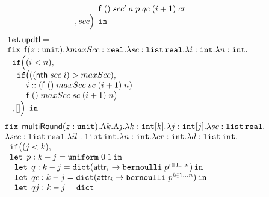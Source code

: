 \begin{figure}
\[\begin{array}{l}
 \hspace{1.2cm} \mathsf{f}  \; () \; scc' \; a \; p \; qc
                \; (i+1) \;  cr  \\ 
 \hspace{0.2cm} , scc  \Big ) \; \mathop{ \mathtt{in}}
\end{array}
\]
%
%
\[
\begin{array}{l}
\mathop{\mathtt{let}} \mathsf{updtI} = \\
                 \mathop{\mathtt{fix}} \;  \mathsf{f}(z : \mathtt{unit}). \lambda maxScc: \mathtt{real}. 
                 \lambda sc: \mathtt{list} \, \mathtt{real}. \lambda i: \mathtt{int}. \lambda n: \mathtt{int}. \\
 \hspace{.2cm}   \mathtt{if} \Big (   (i < n)  ,  \\
 \hspace{0.4cm}  \mathtt{if} \big( ( ( \mathsf{nth} \; scc \; i)  >  maxScc  ) ,       \\
 \hspace{0.8cm}  i :: ( \mathsf{f}  \; () \; maxScc \; sc
                 \; (i+1) \; n  )\\
 \hspace{0.8cm}  \mathsf{f}  \; () \; maxScc \; sc
                 \; (i+1) \; n  \big )  \\
 \hspace{0.2cm}  , [] \Big ) \; \mathop{ \mathtt{in}}
\end{array}
\]
%
%
\[
\begin{array}{l}
 \mathop{\mathtt{fix}} \;  \mathsf{multiRound}(z : \mathtt{unit}). \Lambda k. \Lambda j. 
        \lambda k: \mathtt{int}[k]. \lambda j: \mathtt{int}[j]. \lambda sc: \mathtt{list} \, \mathtt{real}.\\
        \lambda scc: \mathtt{list} \, \mathtt{real}. \lambda il: \mathtt{list} \, \mathtt{int}. \lambda n: \mathtt{int}.
        \lambda cr: \mathtt{int}. \lambda d: \mathtt{list} \, \mathtt{int}.\\
 \hspace{.2cm}  \mathtt{if}   \big (   (j < k)  ,  \\
 \hspace{.2cm}  \mathop{\mathtt{let}} \; p: k - j = \mathtt{uniform} \; 0 \; 1 \mathop{ \mathtt{in}} \\
 \hspace{0.4cm} \mathop{\mathtt{let}} \; q: k - j = 
   \mathtt{dict} 
   (\mathsf{attr}_i \to \mathtt{bernoulli} \; p^{i \in 1\dots n}) \mathop{ \mathtt{in}} \\
 \hspace{0.4cm} \mathop{\mathtt{let}} \; qc: k - j = \mathtt{dict} 
 (\mathsf{attr}_i \to \mathtt{bernoulli} \; p^{i \in 1\dots n}) \mathop{ \mathtt{in}} \\
 \hspace{0.4cm} \mathop{\mathtt{let}} \; qj : k - j = \mathtt{dict} 

\end{array}\]
\end{figure}
